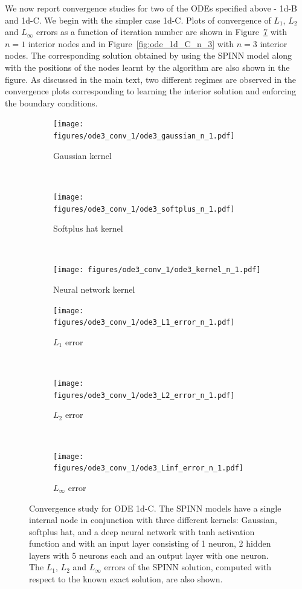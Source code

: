 \documentclass[12pt]{article}
\begin{document}
We now report convergence studies for two of the ODEs specified above - 1d-B and 1d-C. We begin with the simpler case 1d-C. Plots of convergence of $L_1$, $L_2$ and $L_{\infty}$ errors as a function of iteration number are shown in Figure~\ref{fig:ode_1d_C_n_1} with $n=1$ interior nodes and in Figure~\ref{fig:ode_1d_C_n_3} with $n=3$ interior nodes. The corresponding solution obtained by using the SPINN model along with the positions of the nodes learnt by the algorithm are also shown in the figure. As discussed in the main text, two different regimes are observed in the convergence plots corresponding to learning the interior solution and enforcing the boundary conditions.

\begin{figure}
\begin{subfigure}{0.32\textwidth}
\centering
\texttt{[image: figures/ode3\_conv\_1/ode3\_gaussian\_n\_1.pdf]}
\caption{Gaussian kernel}
\label{fig:ode3_gaussian_n_1}
\end{subfigure}
~
\begin{subfigure}{0.32\textwidth}
\centering
\texttt{[image: figures/ode3\_conv\_1/ode3\_softplus\_n\_1.pdf]}
\caption{Softplus hat kernel}
\label{fig:ode3_softplus_n_1}
\end{subfigure}
~
\begin{subfigure}{0.32\textwidth}
\centering
\texttt{[image: figures/ode3\_conv\_1/ode3\_kernel\_n\_1.pdf]}
\caption{Neural network kernel}
\label{fig:ode3_kernel_n_1}
\end{subfigure}
\begin{subfigure}{0.32\textwidth}
\centering
\texttt{[image: figures/ode3\_conv\_1/ode3\_L1\_error\_n\_1.pdf]}
\caption{$L_1$ error}
\label{fig:ode3_L1_n_1}
\end{subfigure}
~
\begin{subfigure}{0.32\textwidth}
\centering
\texttt{[image: figures/ode3\_conv\_1/ode3\_L2\_error\_n\_1.pdf]}
\caption{$L_2$ error}
\label{fig:ode3_L2_n_1}
\end{subfigure}
~
\begin{subfigure}{0.32\textwidth}
\centering
\texttt{[image: figures/ode3\_conv\_1/ode3\_Linf\_error\_n\_1.pdf]}
\caption{$L_{\infty}$ error}
\label{fig:ode3_Linf_n_1}
\end{subfigure}
\caption{Convergence study for ODE 1d-C. The SPINN models have a single internal node in conjunction with three different kernels: Gaussian, softplus hat, and a deep neural network with tanh activation function and with an input layer consisting of 1 neuron, 2 hidden layers with 5 neurons each and an output layer with one neuron. The $L_1$, $L_2$ and $L_{\infty}$ errors of the SPINN solution, computed with respect to the known exact solution, are also shown.}
\label{fig:ode_1d_C_n_1}
\end{figure}
\end{document}
